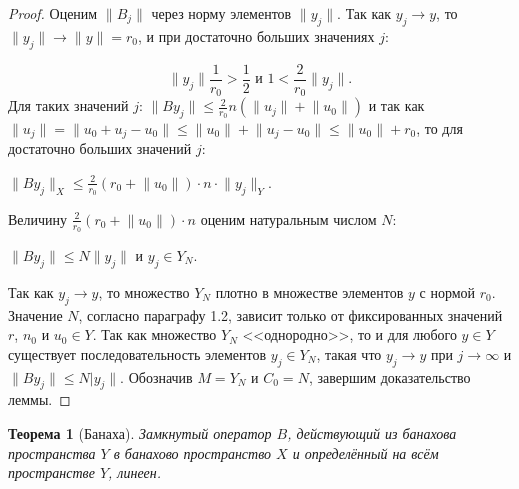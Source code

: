 \documentclass[12pt,a4paper,titlepage,oneside]{book}
\theoremstyle{definition}
\theoremstyle{plain}
\newtheorem*{theorem}{Теорема}
\theoremstyle{break}
\theoremstyle{remark}
\theoremstyle{remark}
\theoremstyle{remark}
\theoremstyle{remark}
\theoremstyle{plain}
\theoremstyle{plain}
\begin{document}
\begin{proof}
Оценим $\lVert B_j\rVert$ через норму элементов $\lVert y_j\rVert$. Так как $y_j \to y$, то $\lVert y_j\rVert \to \lVert y\rVert=r_0$, и при достаточно больших значениях $j$:

$$\lVert y_j\rVert\frac{1}{r_0}>\frac12 \mbox{ и } 1<\frac{2}{r_0}\lVert y_j\rVert.$$
Для таких значений $j$: $\lVert By_j \rVert \leqslant \frac{2}{r_0}n(\lVert u_j \rVert + \lVert u_0 \rVert)$ и так как $\lVert u_j \rVert = \lVert u_0 + u_j - u_0 \rVert \leqslant \lVert u_0 \rVert + \lVert u_j - u_0 \rVert \leqslant \lVert u_0 \rVert + r_0$, то для достаточно больших значений $j$:

\begin{center}
$\lVert By_j\rVert_X \leqslant \frac{2}{r_0}(r_0 + \lVert u_0\rVert)\cdot n\cdot \lVert y_j\rVert_Y$.
\end{center}

Величину $\frac{2}{r_0}(r_0 + \lVert u_0\rVert)\cdot n$ оценим натуральным числом $N$:

\begin{center}
$\lVert By_j\rVert \leqslant N\lVert y_j\rVert$ и $y_j \in Y_N$.
\end{center}

Так как $y_j \to y$, то множество $Y_N$ плотно в множестве элементов $y$ с нормой $r_0$. Значение $N$, согласно параграфу 1.2, зависит только от фиксированных значений $r$, $n_0$ и $u_0 \in Y$. Так как множество $Y_N$ <<однородно>>, то и для любого $y \in Y$ существует последовательность элементов $y_j \in Y_N$, такая что $y_j \to y$ при $j \to \infty$ и $\lVert By_j\rVert \leqslant N\lvert y_j\rVert$. Обозначив $M = Y_N$ и $C_0 = N$, завершим доказательство леммы.
\end{proof}

\begin{theorem}[Банаха]
Замкнутый оператор $B$, действующий из банахова пространства $Y$ в банахово пространство $X$ и определённый на всём пространстве $Y$, линеен.
\end{theorem}
\end{document}
